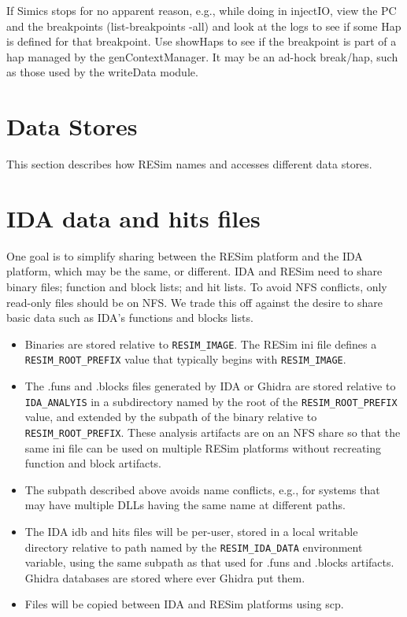 \documentclass[titlepage]{article}
\begin{document}
If Simics stops for no apparent reason, e.g., while doing in injectIO, view the PC and the breakpoints (list-breakpoints -all)
and look at the logs to see if some Hap is defined for that breakpoint.  Use showHaps to see if the breakpoint is part of a hap
managed by the genContextManager.  It may be an ad-hock break/hap, such as those used by the writeData module.

\section{Data Stores}
\label{data-stores}
This section describes how RESim names and accesses different data stores.

\section{IDA data and hits files}
One goal is to simplify sharing between the RESim platform and the IDA platform,
which may be the same, or different.  IDA and RESim need to share binary files; function and block lists; and hit lists.
To avoid NFS conflicts, only read-only files should be on NFS. We trade this off against
the desire to share basic data such as IDA's functions and blocks lists.  

\begin{itemize}

\item Binaries are stored relative to {\tt RESIM\_IMAGE}.  The RESim ini file defines a {\tt RESIM\_ROOT\_PREFIX} value
that typically begins with {\tt RESIM\_IMAGE}. 

\item The .funs and .blocks files generated by IDA or Ghidra are stored relative to {\tt IDA\_ANALYIS} in a subdirectory
named by the root of the {\tt RESIM\_ROOT\_PREFIX} value, and extended by the subpath of the binary relative to 
{\tt RESIM\_ROOT\_PREFIX}.  These analysis artifacts are on an NFS share so that the same ini file can be used on multiple RESim platforms
without recreating function and block artifacts.

\item The subpath described above avoids name conflicts, e.g., for systems that may have multiple DLLs having the same name at different paths.

\item The IDA idb and hits files will be per-user, stored in a local writable directory relative to path 
named by the {\tt RESIM\_IDA\_DATA} environment variable, using the same subpath as that used for .funs and .blocks artifacts.  
Ghidra databases are stored where ever Ghidra put them.

\item Files will be copied between IDA and RESim platforms using scp. 
\end{itemize}
\end{document}
